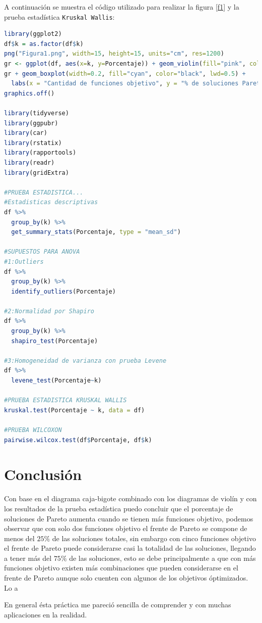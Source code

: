 \documentclass{article}
\begin{document}
A continuación se muestra el código utilizado para realizar la figura \ref{f1} y la prueba estadística \texttt{Kruskal Wallis}:

\lstset{style=mystyle}
\begin{lstlisting}[language=R, caption= Código para graficar y realizar las pruebas estadísticas \texttt{Kruskal Wallis} y \texttt{Wilcoxon}.]
library(ggplot2)
df$k = as.factor(df$k)
png("Figura1.png", width=15, height=15, units="cm", res=1200)
gr <- ggplot(df, aes(x=k, y=Porcentaje)) + geom_violin(fill="pink", color="purple")
gr + geom_boxplot(width=0.2, fill="cyan", color="black", lwd=0.5) +
  labs(x = "Cantidad de funciones objetivo", y = "% de soluciones Pareto")
graphics.off()

library(tidyverse)
library(ggpubr)
library(car)
library(rstatix)
library(rapportools)
library(readr)
library(gridExtra)

#PRUEBA ESTADISTICA...
#Estadisticas descriptivas
df %>%
  group_by(k) %>%
  get_summary_stats(Porcentaje, type = "mean_sd")

#SUPUESTOS PARA ANOVA
#1:Outliers
df %>%
  group_by(k) %>%
  identify_outliers(Porcentaje)

#2:Normalidad por Shapiro
df %>%
  group_by(k) %>%
  shapiro_test(Porcentaje)

#3:Homogeneidad de varianza con prueba Levene
df %>%
  levene_test(Porcentaje~k)

#PRUEBA ESTADISTICA KRUSKAL WALLIS
kruskal.test(Porcentaje ~ k, data = df)

#PRUEBA WILCOXON
pairwise.wilcox.test(df$Porcentaje, df$k)
\end{lstlisting}

\newpage

\section{Conclusi\'{o}n}
Con base en el diagrama caja-bigote combinado con los diagramas de violín y con los resultados de la prueba estadística puedo concluir que el porcentaje de soluciones de Pareto aumenta cuando se tienen más funciones objetivo, podemos observar que con solo dos funciones objetivo el frente de Pareto se compone de menos del $25\%$ de las soluciones totales, sin embargo con cinco funciones objetivo el frente de Pareto puede considerarse casi la totalidad de las soluciones, llegando a tener más del $75\%$ de las soluciones, esto se debe principalmente a que con más funciones objetivo existen más combinaciones que pueden considerarse en el frente de Pareto aunque solo cuenten con algunos de los objetivos óptimizados. Lo a
\smallskip

En general ésta práctica me pareció sencilla de comprender y con muchas aplicaciones en la realidad.
\newpage



\end{document}
